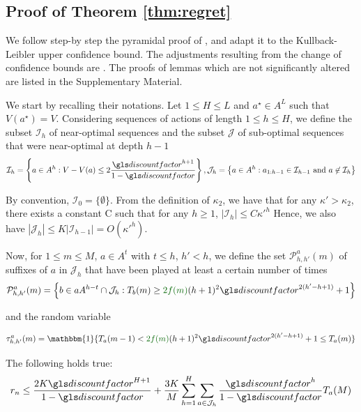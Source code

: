 \subsection{Proof of Theorem \ref{thm:regret}}
\label{sec:regret-proof}


We follow step-by step the pyramidal proof of \citep{Bubeck2010}, and adapt it to the Kullback-Leibler upper confidence bound. The adjustments resulting from the change of confidence bounds are . The proofs of lemmas which are not significantly altered are listed in the Supplementary Material. 

We start by recalling their notations.
Let $1 \leq H \leq L$ and $a^{\star} \in A^L$ such that $V(a^{\star}) = V$.
Considering sequences of actions of length $1 \leq h \leq H$, we define the subset $\mathcal{I}_h$ of near-optimal sequences and the subset $\mathcal{J}$ of sub-optimal sequences that were near-optimal at depth $h-1$
\begin{equation*}
\mathcal{I}_h = \left\{a \in A^h: V - V(a) \leq 2\frac{\discount^{h+1}}{1-\discount}\right\}, \mathcal{J}_h = \left\{a \in A^h: a_{1:h-1} \in \mathcal{I}_{h-1} \text{ and } a \not\in \mathcal{I}_h\right\}
\end{equation*}

By convention, $\mathcal{I}_0 = \{\emptyset\}$. From the definition of $\kappa_2$, we have that for any $\kappa'>\kappa_2$, there exists a constant C such that for any $h \geq 1$,
$|\mathcal{I}_h| \leq C {\kappa'}^h$
Hence, we also have $|\mathcal{J}_h| \leq K|\mathcal{I}_{h-1}| = O({\kappa'}^h)$.

Now, for $1\leq m \leq M$, $a \in A^t$ with $t \leq h$, $h'<h$, we define the set $\mathcal{P}^a_{h,h'}(m)$ of suffixes of $a$ in $\mathcal{J}_h$ that have been played at least a certain number of times
\begin{equation*}
\mathcal{P}^a_{h,h'}(m) = \left\{ b\in a A^{h-t}\cap \mathcal{J}_h : T_b(m) \geq \diff{2f(m)}(h+1)^2\discount^{2(h'-h+1)} + 1 \right\}
\end{equation*}

and the random variable

\begin{equation*}
\tau^a_{h,h'}(m) = \mathbbm{1}\{T_a(m-1) < \diff{2f(m)}(h+1)^2\discount^{2(h'-h+1)} + 1 \leq T_a(m)\}
\end{equation*}

\begin{lemma}
	\label{lemma:expected-regret}
	\begin{leftbar}[lemmabar]
	The following holds true:
	\begin{equation*}
	r_n \leq \frac{2K \discount^{H+1}}{1-\discount} +\frac{3K}{M}\sum_{h=1}^H\sum_{a\in\mathcal{J}_h}\frac{\discount^h}{1-\discount}T_a(M)
	\end{equation*}
	\end{leftbar}
\end{lemma}


